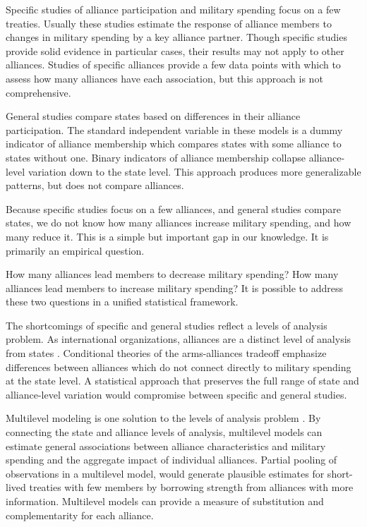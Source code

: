 \documentclass[12pt]{article}
\begin{document}
Specific studies of alliance participation and military spending focus on a few treaties. 
Usually these studies estimate the response of alliance members to changes in military spending by a key alliance partner. 
Though specific studies provide solid evidence in particular cases, their results may not apply to other alliances. 
Studies of specific alliances provide a few data points with which to assess how many alliances have each association, but this approach is not comprehensive. 


General studies compare states based on differences in their alliance participation. 
The standard independent variable in these models is a dummy indicator of alliance membership which compares states with some alliance to states without one. 
Binary indicators of alliance membership collapse alliance-level variation down to the state level. 
This approach produces more generalizable patterns, but does not compare alliances.  


Because specific studies focus on a few alliances, and general studies compare states, we do not know how many alliances increase military spending, and how many reduce it.
This is a simple but important gap in our knowledge. 
It is primarily an empirical question. 


How many alliances lead members to decrease military spending? 
How many alliances lead members to increase military spending? 
It is possible to address these two questions in a unified statistical framework. 


The shortcomings of specific and general studies reflect a levels of analysis problem. 
As international organizations, alliances are a distinct level of analysis from states \citep{Mattes2012}. 
Conditional theories of the arms-alliances tradeoff emphasize differences between alliances which do not connect directly to military spending at the state level. 
A statistical approach that preserves the full range of state and alliance-level variation would compromise between specific and general studies. 


Multilevel modeling is one solution to the levels of analysis problem \citep{GelmanHill2007, McElreath2016}. 
By connecting the state and alliance levels of analysis, multilevel models can estimate general associations between alliance characteristics and military spending and the aggregate impact of individual alliances.
Partial pooling of observations in a multilevel model, would generate plausible estimates for short-lived treaties with few members by borrowing strength from alliances with more information. 
Multilevel models can provide a measure of substitution and complementarity for each alliance. 
\end{document}
